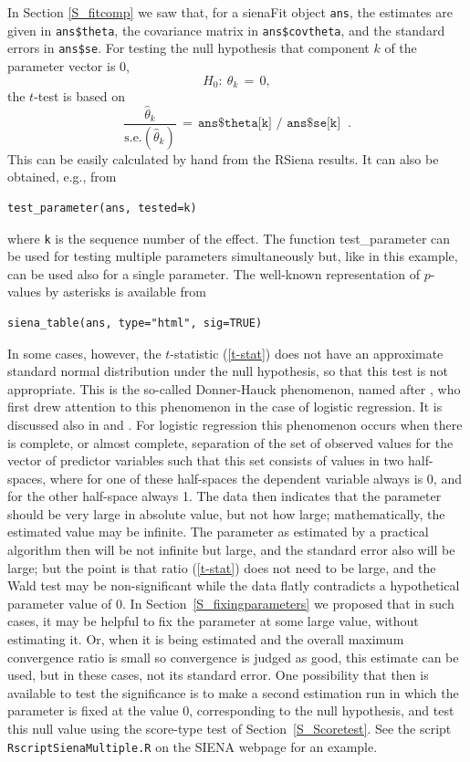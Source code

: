 \documentclass[a4paper,fleqn,11pt]{article}
\newcommand{\+}{\, + \,}
\newcommand{\se}{\mbox{s.e.}}
\newcommand{\sfn}[1]{\textsf{#1}}
\newcommand{\RS}{{\sf \textsf{RSiena} }}
\newcommand{\SI}{{\sf SIENA }}
\begin{document}
In Section \ref{S_fitcomp} we saw that, for a \textsf{sienaFit}
object \texttt{ans}, the estimates are given in
\texttt{ans\$theta}, the covariance matrix in \texttt{ans\$covtheta},
and the standard errors in \texttt{ans\$se}.
For testing the null hypothesis that component $k$ of the parameter
vector is 0,
\[
H_0 : \ \theta_k \,=\, 0 ,
\]
the $t$-test is based on
\begin{equation}
\frac{\hat\theta_k}{\se(\hat\theta_k)} \,=\,
   \texttt{ans\$theta[k] / ans\$se[k] } \ .  \label{t-stat}
\end{equation}
This can be easily calculated by hand from the \RS results.
It can also be obtained, e.g., from
\begin{verbatim}
test_parameter(ans, tested=k)
\end{verbatim}
where \texttt{k} is the sequence number of the effect.
The function \sfn{test\_parameter} can be used for testing multiple
parameters simultaneously but, like in this example,
can be used also for a single parameter.
The well-known representation of $p$-values by asterisks
is available from
\begin{verbatim}
siena_table(ans, type="html", sig=TRUE)
\end{verbatim}
\medskip

In some cases, however, the $t$-statistic (\ref{t-stat}) does not have
an approximate standard normal distribution under the null hypothesis,
so that this test is not appropriate.
This is the so-called Donner-Hauck phenomenon, named after
\citet{HauckDonner77}, who first drew attention to this phenomenon
in the case of logistic regression. It is discussed also in
\citet[section 1.6]{GeyerThompson92} and \citet{AlbertAnderson84}.
For logistic regression this phenomenon occurs when there is complete,
or almost complete, separation of the set of observed values
for the vector of predictor variables such that this set
consists of values in two half-spaces,
where for one of these half-spaces the
dependent variable always is 0, and for the other half-space always 1.
The data then indicates that the parameter
should be very large in absolute value, but not how large;
mathematically, the estimated value may be infinite.
The parameter as estimated by a practical algorithm
then will be not infinite but large, and the standard error
also will be large;
but the point is that ratio (\ref{t-stat}) does not need to be large,
and the Wald test may be non-significant while
the data flatly contradicts a hypothetical parameter value of 0.
In Section~\ref{S_fixingparameters} we proposed that in such cases,
it may be helpful to fix the parameter at some large value,
without estimating it.
Or, when it is being estimated and the
overall maximum convergence ratio is
small so convergence is judged as good, this estimate can be used,
but in these cases, not its standard error.
One possibility that then is available to test the significance
is to make a second estimation run in which the parameter is fixed at
the value 0, corresponding to the null hypothesis, and test
this null value using the score-type test of Section~\ref{S_Scoretest}.
See the script \texttt{RscriptSienaMultiple.R} on the \SI webpage
for an example.
\end{document}
